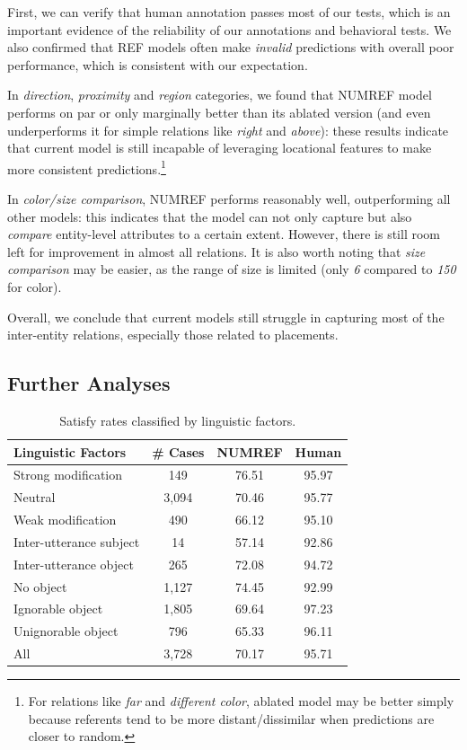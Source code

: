 First, we can verify that human annotation passes most of our tests, which is an important evidence of the reliability of our annotations and behavioral tests. We also confirmed that REF models often make \textit{invalid} predictions with overall poor performance, which is consistent with our expectation.

In \textit{direction}, \textit{proximity} and \textit{region} categories, we found that NUMREF model performs on par or only marginally better than its ablated version (and even underperforms it for simple relations like \textit{right} and \textit{above}): these results indicate that current model is still incapable of leveraging locational features to make more consistent predictions.\footnote{For relations like \textit{far} and \textit{different color}, ablated model may be better simply because referents tend to be more distant/dissimilar when predictions are closer to random.}

In \textit{color/size comparison}, NUMREF performs reasonably well, outperforming all other models: this indicates that the model can not only capture but also \textit{compare} entity-level attributes to a certain extent. However, there is still room left for improvement in almost all relations. It is also worth noting that \textit{size comparison} may be easier, as the range of size is limited (only \textit{6} compared to \textit{150} for color).

Overall, we conclude that current models still struggle in capturing most of the inter-entity relations, especially those related to placements.

\subsection{Further Analyses}
\label{05_subsec:further_analyses}

\begin{table}[h!]
\centering \small
\begin{tabular}{lccc}
\toprule
Linguistic Factors & \# Cases & NUMREF & Human  \\
 \midrule
Strong modification & 149 & 76.51 & 95.97 \\
Neutral & 3,094 & 70.46 & 95.77 \\
Weak modification & 490 & 66.12 & 95.10 \\
\midrule
Inter-utterance subject & 14 & 57.14 & 92.86 \\
Inter-utterance object & 265 & 72.08 & 94.72 \\
No object & 1,127 & 74.45 & 92.99 \\
Ignorable object & 1,805 & 69.64 & 97.23 \\
Unignorable object & 796 & 65.33 & 96.11 \\
\midrule
All & 3,728 & 70.17 & 95.71 \\
\bottomrule
\end{tabular}
\caption{
Satisfy rates classified by linguistic factors.
}
\label{further comparison}
\end{table}

